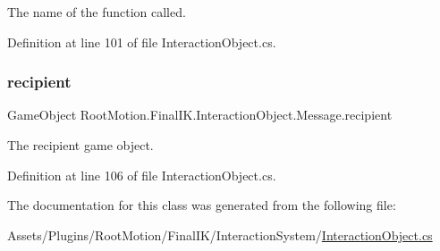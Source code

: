 The name of the function called. 



Definition at line 101 of file Interaction\+Object.\+cs.

\mbox{\label{class_root_motion_1_1_final_i_k_1_1_interaction_object_1_1_message_a15f7ede0dde603ad5ccaffbdd75e134c}} 
\subsubsection{\texorpdfstring{recipient}{recipient}}
{\footnotesize\ttfamily Game\+Object Root\+Motion.\+Final\+I\+K.\+Interaction\+Object.\+Message.\+recipient}



The recipient game object. 



Definition at line 106 of file Interaction\+Object.\+cs.



The documentation for this class was generated from the following file\+:\begin{DoxyCompactItemize}
\item 
Assets/\+Plugins/\+Root\+Motion/\+Final\+I\+K/\+Interaction\+System/\mbox{\hyperlink{_interaction_object_8cs}{Interaction\+Object.\+cs}}\end{DoxyCompactItemize}
